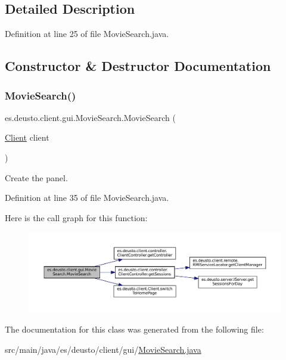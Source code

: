 \subsection{Detailed Description}


Definition at line 25 of file Movie\+Search.\+java.



\subsection{Constructor \& Destructor Documentation}
\mbox{\label{classes_1_1deusto_1_1client_1_1gui_1_1_movie_search_a20d7badf9735287b4da03a9eb3cf09f4}} 
\subsubsection{\texorpdfstring{MovieSearch()}{MovieSearch()}}
{\footnotesize\ttfamily es.\+deusto.\+client.\+gui.\+Movie\+Search.\+Movie\+Search (\begin{DoxyParamCaption}\item[{\mbox{\hyperlink{classes_1_1deusto_1_1client_1_1_client}{Client}}}]{client }\end{DoxyParamCaption})}

Create the panel. 

Definition at line 35 of file Movie\+Search.\+java.

Here is the call graph for this function\+:
\nopagebreak
\begin{figure}[H]
\begin{center}
\leavevmode
\includegraphics[width=350pt]{classes_1_1deusto_1_1client_1_1gui_1_1_movie_search_a20d7badf9735287b4da03a9eb3cf09f4_cgraph}
\end{center}
\end{figure}


The documentation for this class was generated from the following file\+:\begin{DoxyCompactItemize}
\item 
src/main/java/es/deusto/client/gui/\mbox{\hyperlink{_movie_search_8java}{Movie\+Search.\+java}}\end{DoxyCompactItemize}

